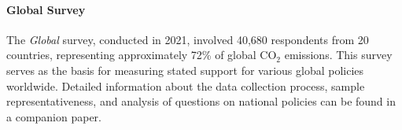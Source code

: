 
\paragraph{Global Survey}

The \textit{Global} survey, conducted in 2021, involved 40,680 respondents from 20 countries, representing approximately 72\% of global CO$_\text{2}$ emissions. This survey serves as the basis for measuring stated support for various global policies worldwide. Detailed information about the data collection process, sample representativeness, and analysis of questions on national policies can be found in a companion paper.\cite{dechezlepretre_fighting_2022}

